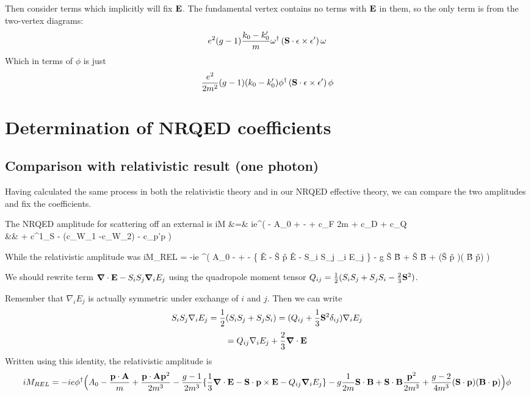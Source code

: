 Then consider terms which implicitly will fix $\mathbf{E}$.  The fundamental vertex contains no terms with $\mathbf{E}$ in them, so the only term is from the two-vertex diagrams:
\[
 e^2 (g-1) \frac{ k_0 - k'_0}{m} \omega^\dagger  \left( \mathbf{S} \cdot \mathbf{\epsilon} \times \mathbf{\epsilon'} \right ) \omega
\]
Which in terms of $\phi$ is just
\[
 \frac{e^2}{2m^2} (g-1) ( k_0 - k'_0 ) \phi^\dagger  \left( \mathbf{S} \cdot \mathbf{\epsilon} \times \mathbf{\epsilon'} \right ) \phi
\]





\section{Determination of NRQED coefficients}



\subsection{Comparison with relativistic result (one photon)}

Having calculated the same process in both the relativistic theory and in our NRQED effective theory, we can compare the two amplitudes and fix the coefficients.

The NRQED amplitude for scattering off an external is 
\beqa
	iM &=&
		ie\phi^\dagger \Bigg( - A_0 +    -  
		+ c_F   {2m}   	
		+ c_D 	
		+ c_Q 	
	\\&&	+ c^{1}_S 
		- (c_{W_1} -c_{W_2}) 	
		-  c_{p'p}  \Bigg )\phi
\eeqa


While the relativistic amplitude was
\beq
iM_{REL} = -ie \phi^\dagger \Big (
		 A_0  -  + 
		- \{ \grad \cdot \v{E} -  \v{S} \cdot \v{p} \times \v{E} - S_i S_j \grad_i E_j \}
		- g \v{S} \cdot \v{B}
		+ \v{S} \cdot \v{B} 
		+ (\v{S} \cdot \v{p} )( \v{B} \cdot \v{p})
	\Big ) \phi
\eeq


We should rewrite term $\mbox{\boldmath$ \nabla $} \cdot \mathbf{E}  - S_i S_j \mbox{\boldmath$ \nabla $} _i E_j$ using the quadropole moment tensor $Q_{ij} = \frac{1}{2} ( S_i S_j + S_j S_i - \frac{2}{3}\mathbf{S}^2 )$.

Remember that $\nabla_i E_j$ is actually symmetric under exchange of $i$ and $j$.  Then we can write
\[
	S_i S_j \nabla_i E_j = \frac{1}{2} (S_i S_j + S_j S_i) = (Q_{ij} + \frac{1}{3} \mathbf{S}^2 \delta_{ij}) \nabla_i E_j
\]
\[
	= Q_{ij} \nabla_i E_j + \frac{2}{3} \mbox{\boldmath$ \nabla $} \cdot \mathbf{E}
\]
Written using this identity, the relativistic amplitude is
\[
iM_{REL} = -ie \phi^\dagger \Big (
		 A_0  - \frac{\mathbf{p}\cdot \mathbf{A} }{m} + \frac{\mathbf{p}\cdot \mathbf{A} \mathbf{p}^2}{2m^3}
		- \frac{g-1}{2m^3}\{ \frac{1}{3}\mbox{\boldmath$ \nabla $} \cdot \mathbf{E} -  \mathbf{S} \cdot \mathbf{p} \times \mathbf{E} - Q_{ij} \mbox{\boldmath$ \nabla $} _i E_j \}
		- g\frac{1}{2m} \mathbf{S} \cdot \mathbf{B}
		+ \mathbf{S} \cdot \mathbf{B} \frac{\mathbf{p}^2}{2m^3}
		+ \frac{g-2}{4m^3}(\mathbf{S} \cdot \mathbf{p} )( \mathbf{B} \cdot \mathbf{p})
	\Big ) \phi
\]

